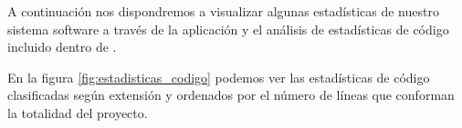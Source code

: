 A continuación nos dispondremos a visualizar algunas estadísticas de nuestro
sistema software a través de la aplicación  \cite{prog:gitstats} y
el análisis de estadísticas de código incluido dentro de .

En la figura \ref{fig:estadisticas_codigo} podemos ver las estadísticas de
código clasificadas según extensión y ordenados por el número de líneas que
conforman la totalidad del proyecto.


